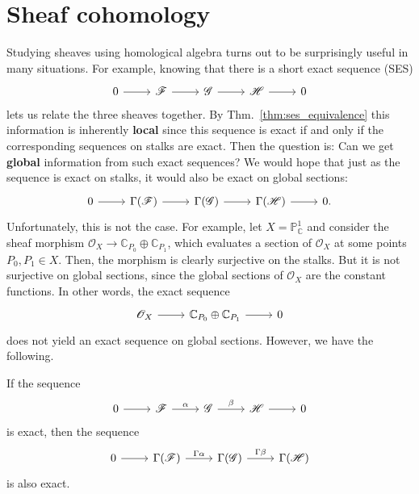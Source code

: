 \section{Sheaf cohomology}
Studying sheaves using homological algebra turns out to be surprisingly
useful in many situations. For example, knowing that there is a
short exact sequence (SES)
\[
  \begin{tikzcd}
    0 \rar & \mathscr{F} \rar & \mathscr{G} \rar &
    \mathscr{H} \rar & 0
  \end{tikzcd}
\]
lets us relate the three sheaves together. By Thm.~\ref{thm:ses_equivalence}
this information is inherently \textbf{local} since this sequence is exact
if and only if the corresponding sequences on stalks are exact.
Then the question is: Can we get \textbf{global} information from
such exact sequences? We would hope that just as the sequence is exact
on stalks, it would also be exact on global sections:
\[
\begin{tikzcd}
  0 \rar & \Gamma(\mathscr{F}) \rar & \Gamma(\mathscr{G})
  \rar & \Gamma(\mathscr{H}) \rar & 0.
\end{tikzcd}
\]
Unfortunately, this is not the case. For example, let
$X=\mathbb{P}^{1}_{\mathbb{C}}$ and consider the sheaf morphism
$\mathscr{O}_{X}\to\mathbb{C}_{P_{0}}\oplus\mathbb{C}_{P_{1}}$,
which evaluates a section of $\mathscr{O}_{X}$ at some points $P_{0},P_{1}
\in X$. Then, the morphism is clearly surjective on the stalks. But it is
not surjective on global sections, since the global sections of
$\mathscr{O}_{X}$ are the constant functions. In other words, the exact
sequence
\[\begin{tikzcd}
    \mathscr{O}_{X}\rar & \mathbb{C}_{P_{0}}\oplus\mathbb{C}_{P_{1}}\rar & 0
  \end{tikzcd}\]
does not yield an exact sequence on global sections. However, we have the
following.
\begin{prop}
  If the sequence
  \[
  \begin{tikzcd}
    0\rar & \mathscr{F}\rar{\alpha} & \mathscr{G}\rar{\beta}
    & \mathscr{H}\rar & 0
  \end{tikzcd}
  \]
  is exact, then the sequence
  \[
  \begin{tikzcd}
    0\rar & \Gamma(\mathscr{F})\rar{\Gamma\alpha}
    & \Gamma(\mathscr{G})\rar{\Gamma\beta}
    & \Gamma(\mathscr{H})
  \end{tikzcd}
  \]
  is also exact.
\end{prop}

